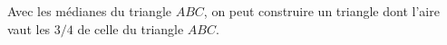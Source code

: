 Avec les médianes du triangle $ABC$, on peut construire un triangle dont l'aire vaut les $3/4$ de celle du triangle $ABC$.
